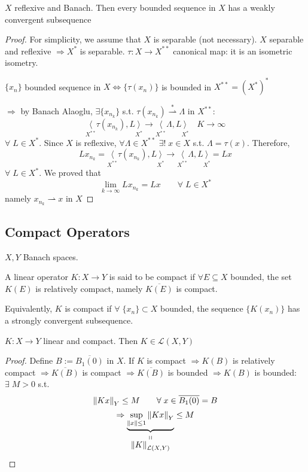 \begin{theorem}
    \(X\) reflexive and Banach. Then every bounded sequence in \(X\) has a weakly convergent subsequence
\end{theorem}

\begin{proof}
    For simplicity, we assume that \(X\) is separable (not necessary). \(X \) separable and reflexive \(\Rightarrow X^*\) is separable. \(\tau:X \to X^{**}\) canonical map: it is an isometric isometry.

    \(\{x_n\}\) bounded sequence in \(X \iff \{ \tau(x_n) \}\) is bounded in \(X^{**} = (X^*)^*\)
        
    \(\Rightarrow \) by Banach Alaoglu, \(\exists \{x_{n_k}\}\) s.t. \(\tau(x_{n_k}) \overset{*}{\rightharpoonup} \Lambda \) in \(X^{**}\):
    \[
        \underset{X^{**}}{\langle}\tau(x_{n_k}), L \underset{X^*}{\rangle} \to \underset{X^{**}}{\langle}\Lambda, L \underset{X^*}{\rangle} \quad K \to \infty
    \]
    \(\forall\; L \in X^*.\) Since \(X\) is reflexive, \(\forall \Lambda \in X^{**} \) \(\exists ! \; x \in X\) s.t. \(\Lambda = \tau (x)\). Therefore, 
    \[
        L x_{n_k} = \underset{X^{**}}{\langle}\tau(x_{n_k}), L \underset{X^*}{\rangle} \to \underset{X^{**}}{\langle}\Lambda, L \underset{X^*}{\rangle} = Lx
    \]
    \(\forall\; L \in X^*\). We proved that 
    \[
        \lim_{k \to \infty} L x_{n_k} = Lx \qquad \forall\; L \in X^*
    \]
    namely \(x_{n_k} \rightharpoonup x\) in \(X\)
\end{proof}

\subsection*{Compact Operators}
\(X, Y\) Banach spaces. 
\begin{definition}
    A linear operator \(K:X \to Y\) is said to be compact if \(\forall E \subseteq X\) bounded, the set \(K(E)\) is relatively compact, namely \(\overline{K(E)}\) is compact. 

    Equivalently, \(K\) is compact if \(\forall \; \{x_n\} \subset X \) bounded, the sequence \(\{K(x_n)\}\) has a strongly convergent subsequence. 
\end{definition}
\begin{proposition}
    \(K:X \to Y\) linear and compact. Then \(K \in \mathcal{L}(X, Y)\)
\end{proposition}
\begin{proof}
    Define \(B:=\overline{B_1(0)}\) in \(X\). If \(K\) is compact 
    \(\Rightarrow K(B) \) is relatively compact 
    \(\Rightarrow \overline{K(B)}\) is compact 
    \(\Rightarrow \overline{K(B)}\) is bounded
    \(\Rightarrow K(B)\) is bounded: \(\exists \; M>0 \) s.t. 
    \[
        \norm{Kx}_Y \leq M \qquad \forall \; x \in \overline{B_1(0)} = B
    \]
    \[
        \Rightarrow \stackbelow{\underbrace{\sup_{\norm{x} \leq 1} \norm{Kx}_Y}}{\norm{K}_{\mathcal{L}(X, Y)}} \leq M
    \]
\end{proof}

